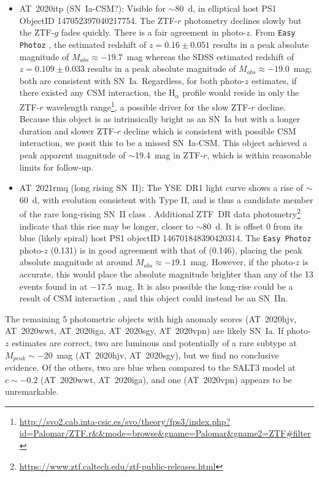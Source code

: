 \documentclass[twocolumn]{aastex63}
\begin{document}
\begin{itemize}
    \item AT~2020itp (SN~Ia-CSM?): Visible for $\sim$80~d, in elliptical host PS1 ObjectID 147052397040217754. The ZTF-$r$ photometry declines slowly but the ZTF-$g$ fades quickly. There is a fair agreement in photo-$z$. From \texttt{Easy Photoz} \citep{Aleo2023}, the estimated redshift of $z=0.16 \pm 0.051$ results in a peak absolute magnitude of $M_{abs}\approx-19.7$~mag whereas the SDSS estimated redshift of $z=0.109 \pm 0.033$ \citep{Csabai2003} results in a peak absolute magnitude of $M_{abs}\approx-19.0$~mag; both are consistent with SN~Ia. Regardless, for both photo-$z$ estimates, if there existed any CSM interaction, the H$_{\alpha}$ profile would reside in only the ZTF-$r$ wavelength range\footnote{\url{http://svo2.cab.inta-csic.es/svo/theory/fps3/index.php?id=Palomar/ZTF.r\&\&mode=browse\&gname=Palomar\&gname2=ZTF\#filter}}, a possible driver for the slow ZTF-$r$ decline. Because this object is as intrinsically bright as an SN~Ia but with a longer duration and slower ZTF-$r$ decline which is consistent with possible CSM interaction, we posit this to be a missed SN~Ia-CSM. This object achieved a peak apparent magnitude of $\sim$19.4~mag in ZTF-$r$, which is within reasonable limits for follow-up.
    \item AT~2021rmq (long rising SN~II): The YSE~DR1 light curve shows a rise of $\sim$60~d, with evolution consistent with Type II, and is thus a candidate member of the rare long-rising SN~II class \citep{Sit2022}. Additional ZTF~DR data photometry\footnote{\url{https://www.ztf.caltech.edu/ztf-public-releases.html}} indicate that this rise may be longer, closer to $\sim$80~d. It is offset 0 from its blue (likely spiral) host PS1 objectID 146701848390420314. The \texttt{Easy Photoz} \citep{Aleo2023} photo-$z$ (0.131) is in good agreement with that of \cite{Beck2021} (0.146), placing the peak absolute magnitude at around $M_{abs}\approx-19.1$~mag. However, if the photo-$z$ is accurate, this would place the absolute magnitude brighter than any of the 13 events found in \cite{Sit2022} at $-17.5$~mag. It is also possible the long-rise could be a result of CSM interaction \citep{Nyholm2020}, and this object could instead be an SN~IIn.
\end{itemize}

The remaining 5 photometric objects with high anomaly scores (AT~2020hjv, AT~2020wwt, AT~2020iga, AT~2020sgy, AT~2020vpn) are likely SN~Ia. If photo-$z$ estimates are correct, two are luminous and potentially of a rare subtype at $M_{peak}\sim-20$~mag (AT~2020hjv, AT~2020sgy), but we find no conclusive evidence. Of the others, two are blue when compared to the SALT3 \citep{Kenworthy2021} model at $c\sim-0.2$ (AT~2020wwt, AT~2020iga), and one (AT~2020vpn) appears to be unremarkable. \par
\end{document}
